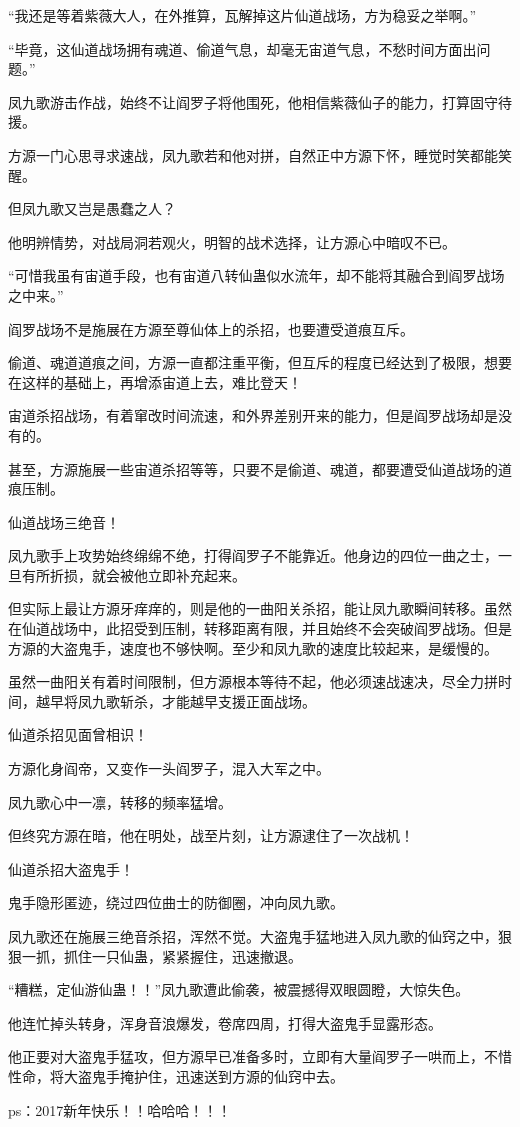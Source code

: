 \begin{this_body}
“我还是等着紫薇大人，在外推算，瓦解掉这片仙道战场，方为稳妥之举啊。”

“毕竟，这仙道战场拥有魂道、偷道气息，却毫无宙道气息，不愁时间方面出问题。”

凤九歌游击作战，始终不让阎罗子将他围死，他相信紫薇仙子的能力，打算固守待援。

方源一门心思寻求速战，凤九歌若和他对拼，自然正中方源下怀，睡觉时笑都能笑醒。

但凤九歌又岂是愚蠢之人？

他明辨情势，对战局洞若观火，明智的战术选择，让方源心中暗叹不已。

“可惜我虽有宙道手段，也有宙道八转仙蛊似水流年，却不能将其融合到阎罗战场之中来。”

阎罗战场不是施展在方源至尊仙体上的杀招，也要遭受道痕互斥。

偷道、魂道道痕之间，方源一直都注重平衡，但互斥的程度已经达到了极限，想要在这样的基础上，再增添宙道上去，难比登天！

宙道杀招战场，有着窜改时间流速，和外界差别开来的能力，但是阎罗战场却是没有的。

甚至，方源施展一些宙道杀招等等，只要不是偷道、魂道，都要遭受仙道战场的道痕压制。

仙道战场三绝音！

凤九歌手上攻势始终绵绵不绝，打得阎罗子不能靠近。他身边的四位一曲之士，一旦有所折损，就会被他立即补充起来。

但实际上最让方源牙痒痒的，则是他的一曲阳关杀招，能让凤九歌瞬间转移。虽然在仙道战场中，此招受到压制，转移距离有限，并且始终不会突破阎罗战场。但是方源的大盗鬼手，速度也不够快啊。至少和凤九歌的速度比较起来，是缓慢的。

虽然一曲阳关有着时间限制，但方源根本等待不起，他必须速战速决，尽全力拼时间，越早将凤九歌斩杀，才能越早支援正面战场。

仙道杀招见面曾相识！

方源化身阎帝，又变作一头阎罗子，混入大军之中。

凤九歌心中一凛，转移的频率猛增。

但终究方源在暗，他在明处，战至片刻，让方源逮住了一次战机！

仙道杀招大盗鬼手！

鬼手隐形匿迹，绕过四位曲士的防御圈，冲向凤九歌。

凤九歌还在施展三绝音杀招，浑然不觉。大盗鬼手猛地进入凤九歌的仙窍之中，狠狠一抓，抓住一只仙蛊，紧紧握住，迅速撤退。

“糟糕，定仙游仙蛊！！”凤九歌遭此偷袭，被震撼得双眼圆瞪，大惊失色。

他连忙掉头转身，浑身音浪爆发，卷席四周，打得大盗鬼手显露形态。

他正要对大盗鬼手猛攻，但方源早已准备多时，立即有大量阎罗子一哄而上，不惜性命，将大盗鬼手掩护住，迅速送到方源的仙窍中去。

ps：2017新年快乐！！哈哈哈！！！

\end{this_body}

